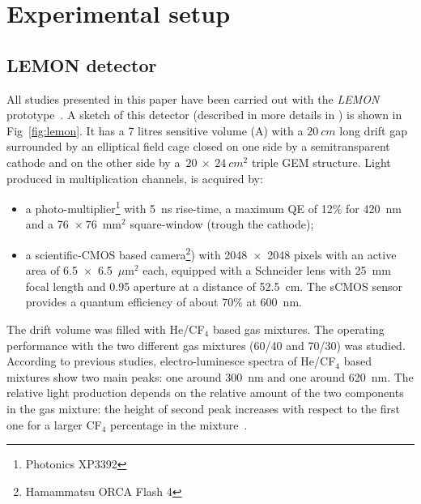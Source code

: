 \documentclass[a4paper,11pt]{article}
\begin{document}
\section{Experimental setup}

\subsection{LEMON detector}
\label{sect:lemon}
All studies presented in this paper have been carried out with the {\it LEMON} prototype~\cite{bib:eps, bib:ieee17, bib:ieee18}.
A sketch of this detector (described in more details in \cite{bib:fe55}) is shown in Fig~\ref{fig:lemon}.
It has a 7 litres sensitive volume (A) with a $20~cm$ long drift gap surrounded by an elliptical field cage closed on one side by a semitransparent cathode and on the other side by a~$20~\times~24~cm^2$ triple GEM structure.
Light produced in multiplication channels, is acquired by:
\begin{itemize}
    \item a photo-multiplier\footnote{Photonics XP3392} with 5~ns rise-time, a maximum QE of 12\% for 420~nm and a 76~$\times~76$~mm$^2$ square-window (trough the cathode);
    \item a scientific-CMOS based camera\footnote{Hamammatsu ORCA Flash 4}) with 2048~$\times$~2048 pixels with an active area of 6.5~$\times$~6.5~$\mu$m$^2$ each, equipped with a Schneider lens with 25~mm focal length and 0.95 aperture at a distance of 52.5~cm. The sCMOS sensor provides a quantum efficiency of about 70\% at 600~nm.
\end{itemize}
 
The drift volume was filled with He/CF$_4$ based gas mixtures. 
The operating performance with the two different gas mixtures (60/40 and 70/30) was studied.
According to previous studies, 
electro-luminesce spectra of He/CF$_4$ based mixtures show two main peaks: one around 300~nm and one around 620~nm. The relative light production depends on the relative amount of the two components in the gas mixture: the height of second peak increases with respect to the first one for a larger CF$_4$ percentage in the mixture~\cite{bib:Fraga}.
\end{document}
